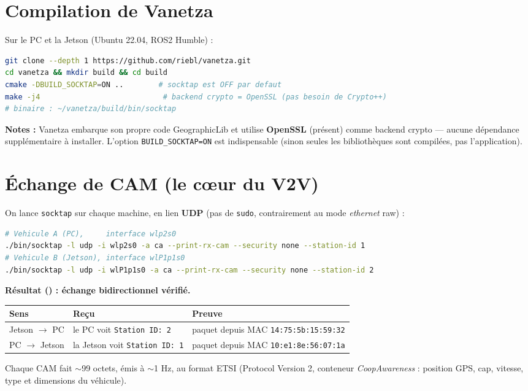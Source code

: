 \documentclass[a4paper,11pt]{article}
\newcommand{\ok}{\textcolor{success}{\checkmark}}
\begin{document}
\section{Compilation de Vanetza}
Sur le PC et la Jetson (Ubuntu 22.04, ROS2 Humble) :
\begin{lstlisting}[language=bash]
git clone --depth 1 https://github.com/riebl/vanetza.git
cd vanetza && mkdir build && cd build
cmake -DBUILD_SOCKTAP=ON ..        # socktap est OFF par defaut
make -j4                            # backend crypto = OpenSSL (pas besoin de Crypto++)
# binaire : ~/vanetza/build/bin/socktap
\end{lstlisting}
\textbf{Notes :} Vanetza embarque son propre code GeographicLib et utilise
\textbf{OpenSSL} (présent) comme backend crypto --- aucune dépendance
supplémentaire à installer. L'option \texttt{BUILD\_SOCKTAP=ON} est indispensable
(sinon seules les bibliothèques sont compilées, pas l'application).

\section{Échange de CAM (le cœur du V2V)}
On lance \texttt{socktap} sur chaque machine, en lien \textbf{UDP} (pas de
\texttt{sudo}, contrairement au mode \emph{ethernet} raw) :
\begin{lstlisting}[language=bash]
# Vehicule A (PC),     interface wlp2s0
./bin/socktap -l udp -i wlp2s0 -a ca --print-rx-cam --security none --station-id 1
# Vehicule B (Jetson), interface wlP1p1s0
./bin/socktap -l udp -i wlP1p1s0 -a ca --print-rx-cam --security none --station-id 2
\end{lstlisting}
\textbf{Résultat (\ok) : échange bidirectionnel vérifié.}
\begin{center}
\begin{tabularx}{\textwidth}{@{}l l X@{}}
\toprule
Sens & Reçu & Preuve \\
\midrule
Jetson $\rightarrow$ PC & le PC voit \texttt{Station ID: 2} & paquet depuis MAC \texttt{14:75:5b:15:59:32} \\
PC $\rightarrow$ Jetson & la Jetson voit \texttt{Station ID: 1} & paquet depuis MAC \texttt{10:e1:8e:56:07:1a} \\
\bottomrule
\end{tabularx}
\end{center}
Chaque CAM fait $\sim$99 octets, émis à $\sim$1 Hz, au format ETSI (Protocol
Version 2, conteneur \emph{CoopAwareness} : position GPS, cap, vitesse, type et
dimensions du véhicule).
\end{document}
